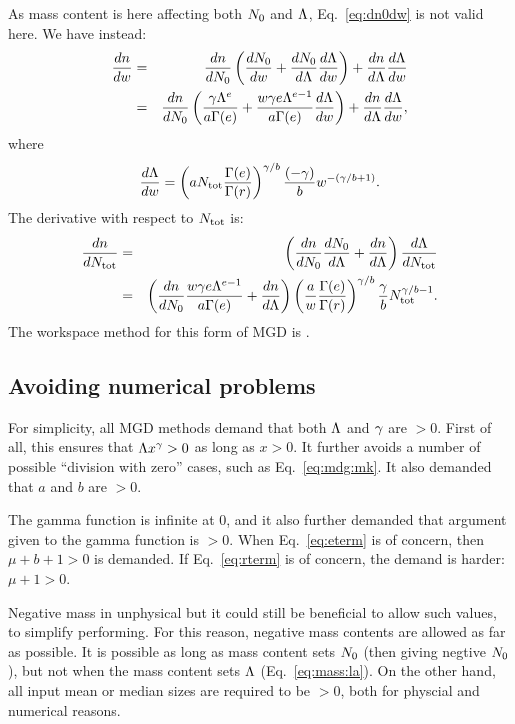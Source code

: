 As mass content is here affecting both $N_0$ and $\Lambda$,
Eq.~\ref{eq:dn0dw} is not valid here. We have instead:
\begin{eqnarray}
  \frac{dn}{dw} &=& \frac{dn}{dN_0}\left(\frac{dN_0}{dw} + 
     \frac{dN_0}{d\Lambda}\frac{d\Lambda}{dw}\right) +
                    \frac{dn}{d\Lambda} \frac{d\Lambda}{dw} \nonumber\\
 &=& \frac{dn}{dN_0} \left( \frac{\gamma\Lambda^e}{a\Gamma(e)} +
     \frac{w\gamma e\Lambda^{e-1}}{a\Gamma(e)} \frac{d\Lambda}{dw}\right) +
     \frac{dn}{d\Lambda} \frac{d\Lambda}{dw},
\end{eqnarray}
where
\begin{equation}
  \frac{d\Lambda}{dw} = \left(aN_{\mathrm{tot}}\frac{\Gamma(e)}{\Gamma(r)}\right)^{\gamma/b}
     \frac{(-\gamma)}{b}w^{-(\gamma/b+1)}.
\end{equation}
The derivative with respect to $N_{\mathrm{tot}}$ is:
\begin{eqnarray}
  \frac{dn}{dN_{\mathrm{tot}}} &=& \left( \frac{dn}{dN_0}\frac{dN_0}{d\Lambda} + 
                        \frac{dn}{d\Lambda} \right) \frac{d\Lambda}{dN_{\mathrm{tot}}} \nonumber\\
 &=& \left( \frac{dn}{dN_0} \frac{w\gamma e\Lambda^{e-1}}{a\Gamma(e)} + 
                        \frac{dn}{d\Lambda} \right) 
   \left(\frac{a}{w}\frac{\Gamma(e)}{\Gamma(r)}\right)^{\gamma/b} \frac{\gamma}{b}N_{\mathrm{tot}}^{\gamma/b-1}.
\end{eqnarray}
The workspace method for this form of MGD is .



\subsection{Avoiding numerical problems}
%
For simplicity, all MGD methods demand that both $\Lambda$ and $\gamma$ are $>0$.
First of all, this ensures that $\Lambda x^\gamma > 0$ as long as $x>0$. It further
avoids a number of possible ``division with zero'' cases, such as Eq.~\ref{eq:mdg:mk}.
It also demanded that $a$ and $b$ are $>0$. 

The gamma function is infinite at 0, and it also further demanded that argument
given to the gamma function is $>0$. When Eq.~\ref{eq:eterm} is of concern,
then $\mu+b+1>0$ is demanded. If Eq.~\ref{eq:rterm} is of concern, the demand
is harder: $\mu+1>0$.

Negative mass in unphysical but it could still be beneficial to allow such
values, to simplify performing. For this reason, negative mass contents are
allowed as far as possible. It is possible as long as mass content sets $N_0$
(then giving negtive $N_0$), but not when the mass content sets $\Lambda$
(Eq.~\ref{eq:mass:la}). On the other hand, all input mean or median sizes are
required to be $>0$, both for physcial and numerical reasons.


